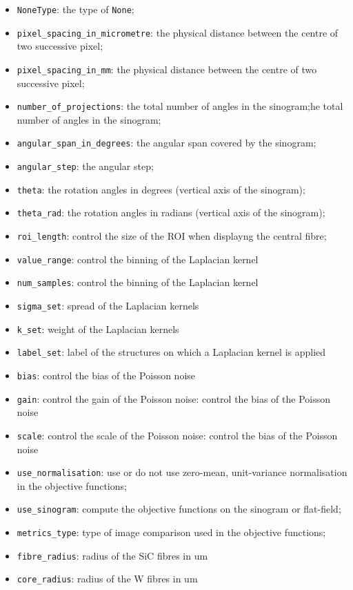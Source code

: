 \documentclass[11pt]{article}
\providecommand{\tightlist}{%
      \setlength{\itemsep}{0pt}\setlength{\parskip}{0pt}}
\begin{document}
\begin{itemize}
\tightlist
\item
  \texttt{NoneType}: the type of \texttt{None};
\item
  \texttt{pixel\_spacing\_in\_micrometre}: the physical distance between
  the centre of two successive pixel;
\item
  \texttt{pixel\_spacing\_in\_mm}: the physical distance between the
  centre of two successive pixel;
\item
  \texttt{number\_of\_projections}: the total number of angles in the
  sinogram;he total number of angles in the sinogram;
\item
  \texttt{angular\_span\_in\_degrees}: the angular span covered by the
  sinogram;
\item
  \texttt{angular\_step}: the angular step;
\item
  \texttt{theta}: the rotation angles in degrees (vertical axis of the
  sinogram);
\item
  \texttt{theta\_rad}: the rotation angles in radians (vertical axis of
  the sinogram);
\item
  \texttt{roi\_length}: control the size of the ROI when displayng the
  central fibre;
\item
  \texttt{value\_range}: control the binning of the Laplacian kernel
\item
  \texttt{num\_samples}: control the binning of the Laplacian kernel
\item
  \texttt{sigma\_set}: spread of the Laplacian kernels
\item
  \texttt{k\_set}: weight of the Laplacian kernels
\item
  \texttt{label\_set}: label of the structures on which a Laplacian
  kernel is applied
\item
  \texttt{bias}: control the bias of the Poisson noise
\item
  \texttt{gain}: control the gain of the Poisson noise: control the bias
  of the Poisson noise
\item
  \texttt{scale}: control the scale of the Poisson noise: control the
  bias of the Poisson noise
\item
  \texttt{use\_normalisation}: use or do not use zero-mean,
  unit-variance normalisation in the objective functions;
\item
  \texttt{use\_sinogram}: compute the objective functions on the
  sinogram or flat-field;
\item
  \texttt{metrics\_type}: type of image comparison used in the objective
  functions;
\item
  \texttt{fibre\_radius}: radius of the SiC fibres in um
\item
  \texttt{core\_radius}: radius of the W fibres in um
\end{itemize}
\end{document}
